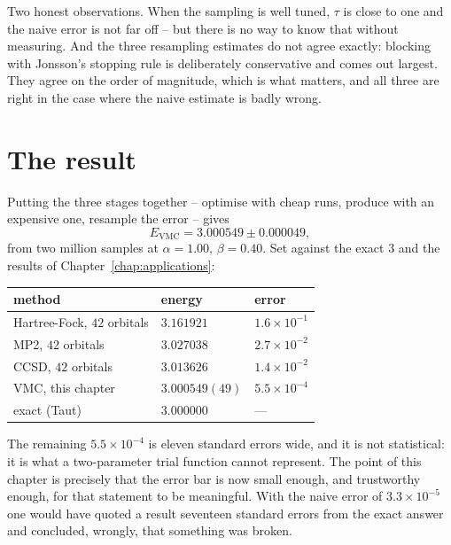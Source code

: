 Two honest observations.  When the sampling is well tuned, $\tau$ is close to
one and the naive error is not far off -- but there is no way to know that
without measuring.  And the three resampling estimates do not agree exactly:
blocking with Jonsson's stopping rule is deliberately conservative and comes
out largest.  They agree on the order of magnitude, which is what matters, and
all three are right in the case where the naive estimate is badly wrong.

\section{The result}
\label{sec:optresult}

Putting the three stages together -- optimise with cheap runs, produce with an
expensive one, resample the error -- gives
\begin{equation}
  E_{\mathrm{VMC}} = 3.000549 \pm 0.000049 ,
  \label{eq:14-final}
\end{equation}
from two million samples at $\alpha=1.00$, $\beta=0.40$.  Set against the
exact $3$ and the results of Chapter~\ref{chap:applications}:

\begin{center}
\renewcommand{\arraystretch}{1.2}
\setlength{\tabcolsep}{14pt}
\begin{tabular}{lll}
\toprule
method & energy & error\\
\midrule
Hartree-Fock, $42$ orbitals & $3.161921$ & $1.6\times10^{-1}$\\
MP2, $42$ orbitals & $3.027038$ & $2.7\times10^{-2}$\\
CCSD, $42$ orbitals & $3.013626$ & $1.4\times10^{-2}$\\
VMC, this chapter & $3.000549(49)$ & $5.5\times10^{-4}$\\
\midrule
exact (Taut) & $3.000000$ & ---\\
\bottomrule
\end{tabular}
\end{center}

\noindent
The remaining $5.5\times10^{-4}$ is eleven standard errors wide, and it is not
statistical: it is what a two-parameter trial function cannot represent.  The
point of this chapter is precisely that the error bar is now small enough, and
trustworthy enough, for that statement to be meaningful.  With the naive error
of $3.3\times10^{-5}$ one would have quoted a result seventeen standard errors
from the exact answer and concluded, wrongly, that something was broken.

